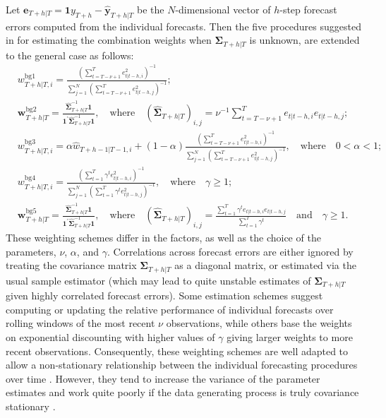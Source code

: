\documentclass[11pt]{article}
\begin{document}
Let $\bm{e}_{T+h|T}=\bm{1} y_{T+h}-\hat{\bm{y}}_{T+h|T}$ be the $N$-dimensional vector of $h$-step forecast errors computed from the individual forecasts. Then the five procedures suggested in \citet{Bates1969-yj} for estimating the combination weights when $\bm{\Sigma}_{T+h|T}$ is unknown, are extended to the general case as follows:
\begin{align}
  & w_{T+h|T, i}^{\text{bg1}}=\frac{\left( \sum_{t=T-\nu+1}^{T} e_{t|t-h, i}^{2} \right)^{-1}}{\sum_{j=1}^{N}\left(\sum_{t=T-\nu+1}^{T} e_{t|t-h, j}^{2}\right)^{-1}}; \label{eq:weight_bg1} \\
  & \bm{w}_{T+h|T}^{\text{bg2}}=\frac{\hat{\bm{\Sigma}}_{T+h|T}^{-1}\bm{1}}{\bm{1}^{\prime} \hat{\bm{\Sigma}}_{T+h|T}^{-1} \bm{1}}, \quad \text{where} \quad (\hat{\bm{\Sigma}}_{T+h|T})_{i, j}=\nu^{-1} \sum_{t=T-\nu+1}^{T} e_{t|t-h, i} e_{t|t-h, j};   \\
  & w_{T+h|T, i}^{\text{bg3}}=\alpha \hat{w}_{T+h-1|T-1, i} + (1-\alpha) \frac{\left( \sum_{t=T-\nu+1}^{T} e_{t|t-h, i}^{2} \right)^{-1}}{\sum_{j=1}^{N}\left(\sum_{t=T-\nu+1}^{T} e_{t|t-h, j}^{2}\right)^{-1}}, \quad \text{where} \quad 0<\alpha<1;   \\
  & w_{T+h|T, i}^{\text{bg4}}=\frac{\left( \sum_{t=1}^{T} \gamma^{t} e_{t|t-h, i}^{2} \right)^{-1}}{\sum_{j=1}^{N}\left(\sum_{t=1}^{T} \gamma^{t} e_{t|t-h, j}^{2}\right)^{-1}}, \quad \text{where} \quad \gamma \geq 1; \label{eq:weight_bg4}  \\
  & \bm{w}_{T+h|T}^{\text{bg5}}=\frac{\hat{\bm{\Sigma}}_{T+h|T}^{-1}\bm{1}}{\bm{1}^{\prime} \hat{\bm{\Sigma}}_{T+h|T}^{-1} \bm{1}}, \quad \text{where} \quad (\hat{\bm{\Sigma}}_{T+h|T})_{i, j}=\frac{\sum_{t=1}^{T} \gamma^{t} e_{t|t-h, i} e_{t|t-h, j}}{\sum_{t=1}^{T} \gamma^{t}} \quad \text{and} \quad \gamma \geq 1. 
\end{align}
These weighting schemes differ in the factors, as well as the choice of the parameters, $\nu$, $\alpha$, and $\gamma$. Correlations across forecast errors are either ignored by treating the covariance matrix $\bm{\Sigma}_{T+h|T}$ as a diagonal matrix, or estimated via the usual sample estimator (which may lead to quite unstable estimates of $\bm{\Sigma}_{T+h|T}$ given highly correlated forecast errors). Some estimation schemes suggest computing or updating the relative performance of individual forecasts over rolling windows of the most recent $\nu$ observations, while others base the weights on exponential discounting with higher values of $\gamma$ giving larger weights to more recent observations. Consequently, these weighting schemes are well adapted to allow a non-stationary relationship between the individual forecasting procedures over time \citep{Newbold1974-lp}. However, they tend to increase the variance of the parameter estimates and work quite poorly if the data generating process is truly covariance stationary \citep{Timmermann2006-en}.
\end{document}
